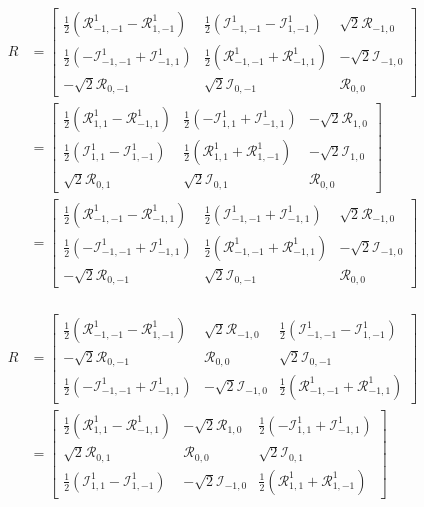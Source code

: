 \documentclass[onecolumn,11pt]{ieeetran}
\begin{document}
\begin{align*}
R
&=
\begin{bmatrix}
\frac{1}{2}(\mathcal{R}^1_{-1,-1}-\mathcal{R}^1_{1,-1}) & \frac{1}{2}(\mathcal{I}^1_{-1,-1}-\mathcal{I}^1_{1,-1}) & \sqrt{2}\mathcal{R}_{-1,0}\\
\frac{1}{2}(-\mathcal{I}^1_{-1,-1}+\mathcal{I}^1_{-1,1})
&\frac{1}{2}(\mathcal{R}^1_{-1,-1}+\mathcal{R}^1_{-1,1})
&-\sqrt{2}\mathcal{I}_{-1,0}\\
-\sqrt{2}\mathcal{R}_{0,-1}
& \sqrt{2}\mathcal{I}_{0,-1}
& \mathcal{R}_{0,0}
\end{bmatrix}\\
&=
\begin{bmatrix}
\frac{1}{2}(\mathcal{R}^1_{1,1}-\mathcal{R}^1_{-1,1}) 
& \frac{1}{2}(-\mathcal{I}^1_{1,1}+\mathcal{I}^1_{-1,1}) 
& -\sqrt{2}\mathcal{R}_{1,0}\\
\frac{1}{2}(\mathcal{I}^1_{1,1}-\mathcal{I}^1_{1,-1})
&  \frac{1}{2}(\mathcal{R}^1_{1,1}+\mathcal{R}^1_{1,-1})
& -\sqrt{2}\mathcal{I}_{1,0}\\
\sqrt{2}\mathcal{R}_{0,1}
&\sqrt{2}\mathcal{I}_{0,1}
& \mathcal{R}_{0,0}
\end{bmatrix}\\
&=
\begin{bmatrix}
\frac{1}{2}(\mathcal{R}^1_{-1,-1}-\mathcal{R}^1_{-1,1}) 
& \frac{1}{2}(\mathcal{I}^1_{-1,-1}+\mathcal{I}^1_{-1,1}) 
& \sqrt{2}\mathcal{R}_{-1,0}\\
\frac{1}{2}(-\mathcal{I}^1_{-1,-1}+\mathcal{I}^1_{-1,1})
&\frac{1}{2}(\mathcal{R}^1_{-1,-1}+\mathcal{R}^1_{-1,1})
&-\sqrt{2}\mathcal{I}_{-1,0}\\
-\sqrt{2}\mathcal{R}_{0,-1}
& \sqrt{2}\mathcal{I}_{0,-1}
& \mathcal{R}_{0,0}
\end{bmatrix}\\
\end{align*}


\begin{align*}
R&=
\begin{bmatrix}
\frac{1}{2}(\mathcal{R}^1_{-1,-1}-\mathcal{R}^1_{1,-1}) 
& \sqrt{2}\mathcal{R}_{-1,0}
& \frac{1}{2}(\mathcal{I}^1_{-1,-1}-\mathcal{I}^1_{1,-1}) \\
-\sqrt{2}\mathcal{R}_{0,-1}
& \mathcal{R}_{0,0}
& \sqrt{2}\mathcal{I}_{0,-1}\\
\frac{1}{2}(-\mathcal{I}^1_{-1,-1}+\mathcal{I}^1_{-1,1})
&-\sqrt{2}\mathcal{I}_{-1,0}
&\frac{1}{2}(\mathcal{R}^1_{-1,-1}+\mathcal{R}^1_{-1,1})
\end{bmatrix}\\
&=
\begin{bmatrix}
\frac{1}{2}(\mathcal{R}^1_{1,1}-\mathcal{R}^1_{-1,1}) 
& -\sqrt{2}\mathcal{R}_{1,0}
& \frac{1}{2}(-\mathcal{I}^1_{1,1}+\mathcal{I}^1_{-1,1}) \\
\sqrt{2}\mathcal{R}_{0,1}
& \mathcal{R}_{0,0}
&\sqrt{2}\mathcal{I}_{0,1}\\
\frac{1}{2}(\mathcal{I}^1_{1,1}-\mathcal{I}^1_{1,-1})
& -\sqrt{2}\mathcal{I}_{-1,0}
&  \frac{1}{2}(\mathcal{R}^1_{1,1}+\mathcal{R}^1_{1,-1})
\end{bmatrix}
\end{align*}
\end{document}
